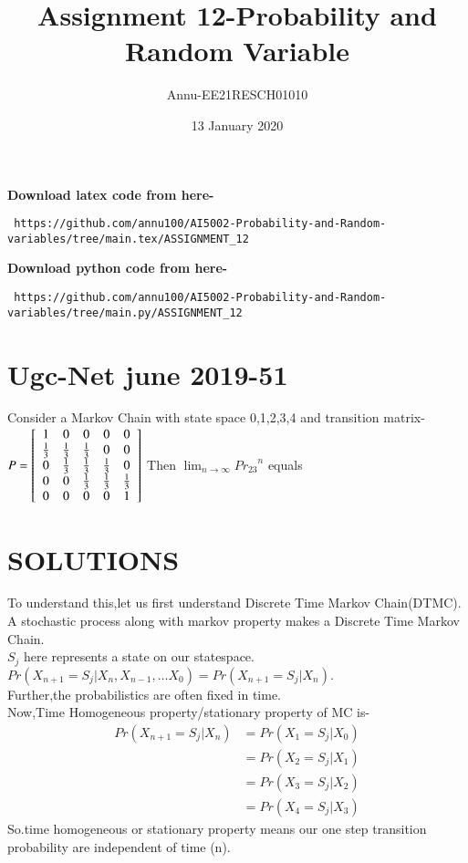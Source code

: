\documentclass[journel,12pt,twocoloums]{IEEEtran}
\title{Assignment 12-Probability and Random Variable}
\author{Annu-EE21RESCH01010}
\date{13 January 2020}
\begin{document}
 \maketitle
\textbf{Download latex code from here-}\\
\begin{lstlisting}
 https://github.com/annu100/AI5002-Probability-and-Random-variables/tree/main.tex/ASSIGNMENT_12
 \end{lstlisting}
\textbf{Download python code from here-}\\
\begin{lstlisting}
 https://github.com/annu100/AI5002-Probability-and-Random-variables/tree/main.py/ASSIGNMENT_12
 \end{lstlisting}
 \section{Ugc-Net june 2019-51}

Consider a Markov Chain with state space {0,1,2,3,4} and transition matrix-\\

\begin{math}
P=\left[
\begin{array}{c c c c c}
    1 & 0 & 0 & 0 & 0\\
    \frac{1}{3} & \frac{1}{3}  & \frac{1}{3}  & 0 & 0\\
    0 & \frac{1}{3}  & \frac{1}{3}  & \frac{1}{3} & 0\\
    0 & 0 & \frac{1}{3} & \frac{1}{3}  & \frac{1}{3}  \\
    0 & 0 & 0 & 0 & 1
\end{array}\right]
\end{math}
Then $\lim_{n \to \infty } {Pr_{23}}^n$ equals


\section{SOLUTIONS}
To understand this,let us first understand Discrete Time Markov Chain(DTMC).\\
A stochastic process along with markov property makes a Discrete Time Markov Chain.\\
$S_j$ here represents a state on our statespace.
$Pr(X_{n+1}=S_j|X_n,X_{n-1},\ldots X_0)=Pr(X_{n+1}=S_j|X_n).$\\
Further,the probabilistics are often fixed in time.\\
Now,Time Homogeneous property/stationary property of MC is-\\
\begin{align}
  Pr(X_{n+1}=S_j|X_n) &= Pr(X_1=S_j | X_0)\\
                      &= Pr(X_2=S_j | X_1)\\
                      &= Pr(X_3=S_j | X_2)\\
                      &= Pr(X_4=S_j | X_3) 
\end{align}
So.time homogeneous or stationary property means our one step transition probability are independent of time (n).\\
\end{document}
